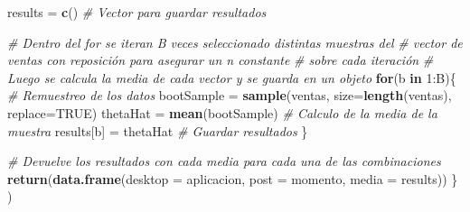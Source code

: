 \documentclass[
  12pt]{article}
\newenvironment{Shaded}{}{}
\newcommand{\CommentTok}[1]{\textcolor[rgb]{0.38,0.63,0.69}{\textit{#1}}}
\newcommand{\ControlFlowTok}[1]{\textcolor[rgb]{0.00,0.44,0.13}{\textbf{#1}}}
\newcommand{\DataTypeTok}[1]{\textcolor[rgb]{0.56,0.13,0.00}{#1}}
\newcommand{\DecValTok}[1]{\textcolor[rgb]{0.25,0.63,0.44}{#1}}
\newcommand{\KeywordTok}[1]{\textcolor[rgb]{0.00,0.44,0.13}{\textbf{#1}}}
\newcommand{\NormalTok}[1]{#1}
\newcommand{\OperatorTok}[1]{\textcolor[rgb]{0.40,0.40,0.40}{#1}}
\newcommand{\OtherTok}[1]{\textcolor[rgb]{0.00,0.44,0.13}{#1}}
\newcommand{\StringTok}[1]{\textcolor[rgb]{0.25,0.44,0.63}{#1}}
\begin{document}
\begin{Shaded}
\begin{Highlighting}[]
{{{{{{{{{\NormalTok{    results =}\StringTok{ }\KeywordTok{c}\NormalTok{() }\CommentTok{# Vector para guardar resultados}
    
    \CommentTok{# Dentro del for se iteran B veces seleccionado distintas muestras del }
    \CommentTok{# vector de ventas con reposición para asegurar un n constante }
    \CommentTok{# sobre cada iteración}
    \CommentTok{# Luego se calcula la media de cada vector y se guarda en un objeto}
    \ControlFlowTok{for}\NormalTok{(b }\ControlFlowTok{in} \DecValTok{1}\OperatorTok{:}\NormalTok{B)\{}
      \CommentTok{# Remuestreo de los datos}
\NormalTok{      bootSample =}\StringTok{ }\KeywordTok{sample}\NormalTok{(ventas, }\DataTypeTok{size=}\KeywordTok{length}\NormalTok{(ventas), }\DataTypeTok{replace=}\OtherTok{TRUE}\NormalTok{) }
\NormalTok{      thetaHat =}\StringTok{ }\KeywordTok{mean}\NormalTok{(bootSample) }\CommentTok{# Calculo de la media de la muestra}
\NormalTok{      results[b] =}\StringTok{ }\NormalTok{thetaHat }\CommentTok{# Guardar resultados}
\NormalTok{    \}}
    
    \CommentTok{# Devuelve los resultados con cada media para cada una de las combinaciones}
    \KeywordTok{return}\NormalTok{(}\KeywordTok{data.frame}\NormalTok{(}\DataTypeTok{desktop =}\NormalTok{ aplicacion, }\DataTypeTok{post =}\NormalTok{ momento, }\DataTypeTok{media =}\NormalTok{ results))}
\NormalTok{  \} }
\NormalTok{)}

}}}}}}}}}
\end{Highlighting}
\end{Shaded}
\end{document}
